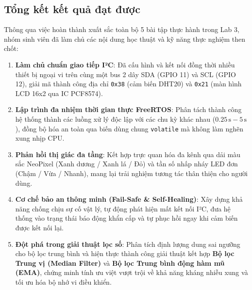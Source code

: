 \subsection{Tổng kết kết quả đạt được}
Thông qua việc hoàn thành xuất sắc toàn bộ 5 bài tập thực hành trong Lab 3, nhóm sinh viên đã làm chủ các nội dung học thuật và kỹ năng thực nghiệm then chốt:
\begin{enumerate}[leftmargin=*]
    \item \textbf{Làm chủ chuẩn giao tiếp I²C}: Đã cấu hình và kết nối đồng thời nhiều thiết bị ngoại vi trên cùng một bus 2 dây SDA (GPIO 11) và SCL (GPIO 12), giải mã thành công địa chỉ \texttt{0x38} (cảm biến DHT20) và \texttt{0x21} (màn hình LCD 16x2 qua IC PCF8574).
    \item \textbf{Lập trình đa nhiệm thời gian thực FreeRTOS}: Phân tách thành công hệ thống thành các luồng xử lý độc lập với các chu kỳ khác nhau ($0.25\,\text{s} - 5\,\text{s}$), đồng bộ hóa an toàn qua biến dùng chung \texttt{volatile} mà không làm nghẽn xung nhịp CPU.
    \item \textbf{Phản hồi thị giác đa tầng}: Kết hợp trực quan hóa đa kênh qua dải màu sắc NeoPixel (Xanh dương / Xanh lá / Đỏ) và tần số nhấp nháy LED đơn (Chậm / Vừa / Nhanh), mang lại trải nghiệm tương tác thân thiện cho người dùng.
    \item \textbf{Cơ chế bảo an thông minh (Fail-Safe \& Self-Healing)}: Xây dựng khả năng chống chịu sự cố vật lý, tự động phát hiện mất kết nối I²C, đưa hệ thống vào trạng thái báo động khẩn cấp và tự phục hồi ngay khi cảm biến được kết nối lại.
    \item \textbf{Đột phá trong giải thuật lọc số}: Phân tích định lượng dung sai ngưỡng cho bộ lọc trung bình và hiện thực thành công giải thuật kết hợp \textbf{Bộ lọc Trung vị (Median Filter)} và \textbf{Bộ lọc Trung bình động hàm mũ (EMA)}, chứng minh tính ưu việt vượt trội về khả năng kháng nhiễu xung và tối ưu hóa bộ nhớ vi điều khiển.
\end{enumerate}

